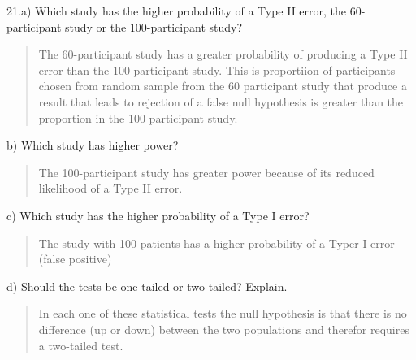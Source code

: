 \documentclass[ignorenonframetext,]{beamer}
\begin{document}
\begin{frame}

\begin{block}{21.a) Which study has the higher probability of a Type II
error, the 60-participant study or the 100-participant study?}

\begin{quote}
The 60-participant study has a greater probability of producing a Type
II error than the 100-participant study. This is proportiion of
participants chosen from random sample from the 60 participant study
that produce a result that leads to rejection of a false null hypothesis
is greater than the proportion in the 100 participant study.
\end{quote}

\end{block}

\begin{block}{b) Which study has higher power?}

\begin{quote}
The 100-participant study has greater power because of its reduced
likelihood of a Type II error.
\end{quote}

\end{block}

\begin{block}{c) Which study has the higher probability of a Type I
error?}

\begin{quote}
The study with 100 patients has a higher probability of a Typer I error
(false positive)
\end{quote}

\end{block}

\begin{block}{d) Should the tests be one-tailed or two-tailed? Explain.}

\begin{quote}
In each one of these statistical tests the null hypothesis is that there
is no difference (up or down) between the two populations and therefor
requires a two-tailed test.
\end{quote}

\end{block}

\end{frame}
\end{document}
